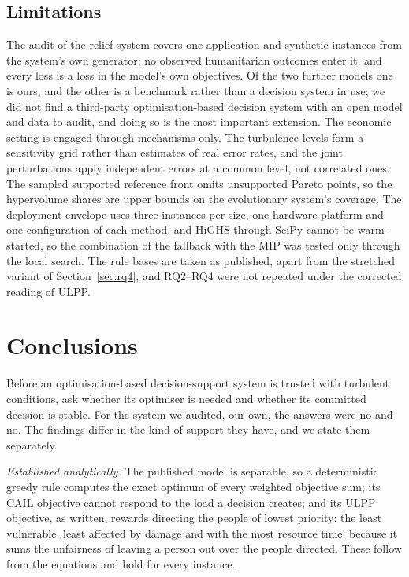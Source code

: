 \documentclass[systems,article,submit,moreauthors,pdftex]{Definitions/mdpi}
\begin{document}
\subsection{Limitations}
The audit of the relief system covers one application and synthetic instances from the system's
own generator; no observed humanitarian outcomes enter it, and every loss is a loss in the model's
own objectives. Of the two further models one is ours, and the other is a benchmark rather than a
decision system in use; we did not find a third-party optimisation-based decision system with an
open model and data to audit, and doing so is the most important extension. The economic setting
is engaged through mechanisms only. The turbulence levels form a sensitivity grid rather than
estimates of real error rates, and the joint perturbations apply independent errors at a common
level, not correlated ones. The sampled supported reference front omits unsupported Pareto points,
so the hypervolume shares are upper bounds on the evolutionary system's coverage. The deployment
envelope uses three instances per size, one hardware platform and one configuration of each
method, and HiGHS through SciPy cannot be warm-started, so the combination of the fallback with
the MIP was tested only through the local search. The rule bases are taken as published, apart
from the stretched variant of Section~\ref{sec:rq4}, and RQ2--RQ4 were not repeated under the
corrected reading of ULPP.

\section{Conclusions}\label{sec:conclusion}
Before an optimisation-based decision-support system is trusted with turbulent conditions, ask
whether its optimiser is needed and whether its committed decision is stable. For the system we
audited, our own, the answers were no and no. The findings differ in the kind of support they
have, and we state them separately.

\emph{Established analytically.} The published model is separable, so a deterministic greedy rule
computes the exact optimum of every weighted objective sum; its CAIL objective cannot respond to
the load a decision creates; and its ULPP objective, as written, rewards directing the people of
lowest priority: the least vulnerable, least affected by damage and with the most resource time,
because it sums the unfairness of leaving a person out over the people directed. These follow from the equations and hold for every instance.
\end{document}

